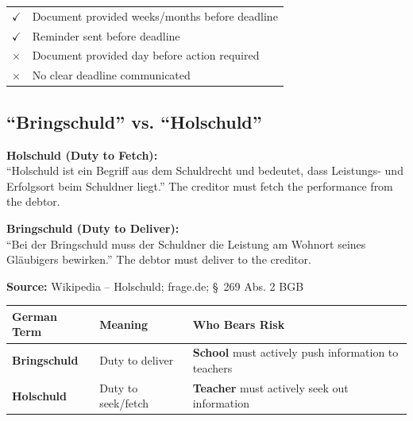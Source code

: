 \documentclass[11pt,a4paper]{article}
\begin{document}
\begin{center}
\begin{tabular}{>{\bfseries}p{4cm}p{9.5cm}}
    \textcolor{successgreen}{$\checkmark$} & Document provided weeks/months before deadline \\
    \textcolor{successgreen}{$\checkmark$} & Reminder sent before deadline \\[0.5em]
    \textcolor{warningred}{$\times$} & Document provided day before action required \\
    \textcolor{warningred}{$\times$} & No clear deadline communicated \\
\bottomrule
\end{tabular}
\end{center}

\subsection{``Bringschuld'' vs. ``Holschuld''}

\begin{sourcebox}
\textbf{Holschuld (Duty to Fetch):}\\
``Holschuld ist ein Begriff aus dem Schuldrecht und bedeutet, dass Leistungs- und Erfolgsort beim Schuldner liegt.'' The creditor must fetch the performance from the debtor.

\textbf{Bringschuld (Duty to Deliver):}\\
``Bei der Bringschuld muss der Schuldner die Leistung am Wohnort seines Gläubigers bewirken.'' The debtor must deliver to the creditor.

\textbf{Source:} Wikipedia -- Holschuld; frage.de; \S~269 Abs. 2 BGB
\end{sourcebox}

\begin{center}
\begin{tabular}{>{\bfseries}p{3cm}p{4.5cm}p{5.5cm}}
\toprule
\textbf{German Term} & \textbf{Meaning} & \textbf{Who Bears Risk} \\
\midrule
Bringschuld & Duty to deliver & \textbf{School} must actively push information to teachers \\[0.5em]
Holschuld & Duty to seek/fetch & \textbf{Teacher} must actively seek out information \\
\bottomrule
\end{tabular}
\end{center}
\end{document}
